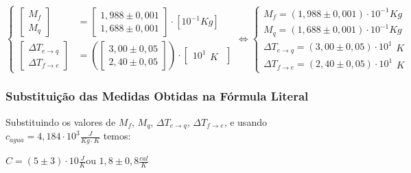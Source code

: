 \documentclass[a4paper]{article}
\begin{document}
			\[
			\begin{cases}
				\left[\begin{array}{c}
					M_{f}\\
					M_{q}
				\end{array}\right] & =\left[\begin{array}{c}
					1,988\pm0,001\\
					1,688\pm0,001
				\end{array}\right]\cdot\left[10^{-1}Kg\right]\\
				\left[\begin{array}{c}
					\Delta T_{e\rightarrow q}\\
					\Delta T_{f\rightarrow e}
				\end{array}\right] & =\left(\left[\begin{array}{c}
					3,00\pm0,05\\
					2,40\pm0,05
				\end{array}\right]\right)\cdot\left[\begin{array}{c}
					10^{1}\begin{array}{c}
					K\end{array}\end{array}\right]
			\end{cases}\Longleftrightarrow\begin{cases}
				M_{f}=\left(1,988\pm0,001\right)\cdot10^{-1}\unit{Kg}\\
				M_{q}=\left(1,688\pm0,001\right)\cdot10^{-1}\unit{Kg}\\
				\Delta T_{e\rightarrow q}=\left(3,00\pm0,05\right)\cdot10^{1}\begin{array}{c}
				\unit{K}\end{array}\\
				\Delta T_{f\rightarrow e}=\left(2,40\pm0,05\right)\cdot10^{1}\begin{array}{c}
				\unit{K}\end{array}
			\end{cases}
			\]

		\subsubsection{Substituição das Medidas Obtidas na Fórmula Literal}

			Substituindo os valores de $M_{f}$, $M_{q}$, $\Delta T_{e\rightarrow q}$,
			$\Delta T_{f\rightarrow e}$, e usando $c_{\acute{a}gua}=4,184\cdot10^{3}\unit{\frac{J}{Kg\cdot K}}$
			temos:

			$C=\left(5\pm3\right)\cdot10\unit{\frac{J}{K}}$ou $1,8\pm0,8\unit{\frac{cal}{K}}$
\end{document}
